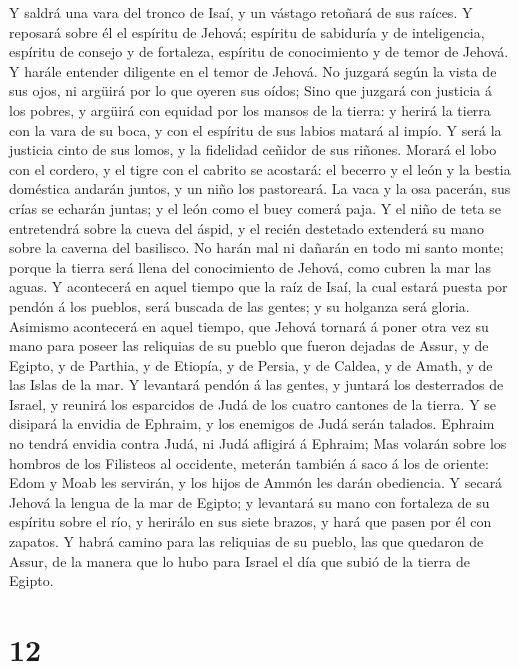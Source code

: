  Y saldrá una vara del tronco de Isaí, y un vástago retoñará
de sus raíces.  Y reposará sobre él el espíritu de Jehová;
espíritu de sabiduría y de inteligencia, espíritu de consejo y de
fortaleza, espíritu de conocimiento y de temor de Jehová.  Y
harále entender diligente en el temor de Jehová. No juzgará según la
vista de sus ojos, ni argüirá por lo que oyeren sus oídos; 
Sino que juzgará con justicia á los pobres, y argüirá con equidad por
los mansos de la tierra: y herirá la tierra con la vara de su boca, y
con el espíritu de sus labios matará al impío.  Y será la
justicia cinto de sus lomos, y la fidelidad ceñidor de sus riñones.
 Morará el lobo con el cordero, y el tigre con el cabrito se
acostará: el becerro y el león y la bestia doméstica andarán juntos, y
un niño los pastoreará.  La vaca y la osa pacerán, sus crías
se echarán juntas; y el león como el buey comerá paja.  Y el
niño de teta se entretendrá sobre la cueva del áspid, y el recién
destetado extenderá su mano sobre la caverna del basilisco. 
No harán mal ni dañarán en todo mi santo monte; porque la tierra será
llena del conocimiento de Jehová, como cubren la mar las aguas.
 Y acontecerá en aquel tiempo que la raíz de Isaí, la cual
estará puesta por pendón á los pueblos, será buscada de las gentes; y su
holganza será gloria.  Asimismo acontecerá en aquel tiempo,
que Jehová tornará á poner otra vez su mano para poseer las reliquias de
su pueblo que fueron dejadas de Assur, y de Egipto, y de Parthia, y de
Etiopía, y de Persia, y de Caldea, y de Amath, y de las Islas de la mar.
 Y levantará pendón á las gentes, y juntará los desterrados
de Israel, y reunirá los esparcidos de Judá de los cuatro cantones de la
tierra.  Y se disipará la envidia de Ephraim, y los
enemigos de Judá serán talados. Ephraim no tendrá envidia contra Judá,
ni Judá afligirá á Ephraim;  Mas volarán sobre los hombros
de los Filisteos al occidente, meterán también á saco á los de oriente:
Edom y Moab les servirán, y los hijos de Ammón les darán obediencia.
 Y secará Jehová la lengua de la mar de Egipto; y levantará
su mano con fortaleza de su espíritu sobre el río, y herirálo en sus
siete brazos, y hará que pasen por él con zapatos.  Y habrá
camino para las reliquias de su pueblo, las que quedaron de Assur, de la
manera que lo hubo para Israel el día que subió de la tierra de Egipto.

\hypertarget{section-11}{%
\section{12}\label{section-11}}

